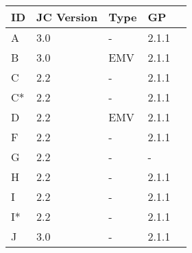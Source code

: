     \centering
    \begin{tabular}{@{}lllll@{}}
        \toprule
        \textbf{ID\footnotemark} & \textbf{JC Version} & \textbf{Type} & \textbf{GP} \\
        \midrule
        A   & 3.0                & -                & 2.1.1 \\
        B   & 3.0                & EMV              & 2.1.1 \\
        C   & 2.2                & -                & 2.1.1 \\
        C*   & 2.2                & -                & 2.1.1 \\
        D   & 2.2                & EMV              & 2.1.1 \\
        F   & 2.2                & -                & 2.1.1 \\
        G   & 2.2                & -                & -     \\
        H   & 2.2                & -                & 2.1.1 \\
        I   & 2.2                & -                & 2.1.1 \\
        I*   & 2.2                & -                & 2.1.1 \\
        J   & 3.0                & -                & 2.1.1 \\
        \bottomrule
    \end{tabular}
    \caption{%
        List of the cards, that undergone the analysis. The star next to the card ID denotes a different physical card of the same type.
        \label{tab:card-list}
    }
